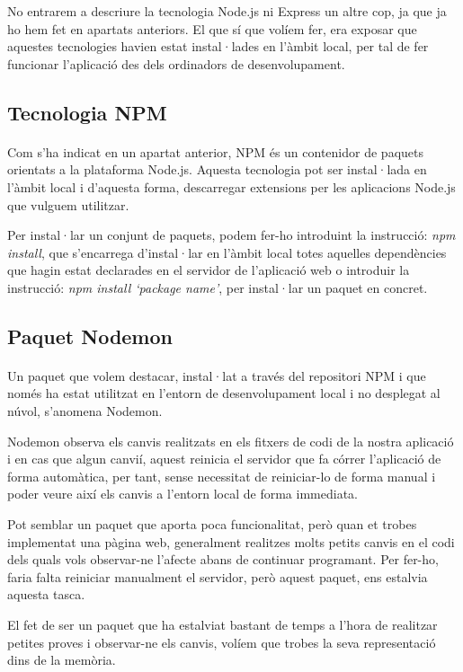     No entrarem a descriure la tecnologia Node.js ni Express un altre cop, ja que ja ho hem fet en apartats anteriors. El que sí que volíem fer, era exposar que aquestes tecnologies havien estat instal·lades en l’àmbit local, per tal de fer funcionar l'aplicació des dels ordinadors de desenvolupament.


    \subsection{Tecnologia NPM}

    \paragraph{}
    Com s'ha indicat en un apartat anterior, NPM és un contenidor de paquets orien\-tats a la plataforma Node.js. Aquesta tecnologia pot ser instal·lada en l'àmbit lo\-cal i d'aquesta forma, descarregar extensions per les aplicacions Node.js que vulguem utilitzar.

    Per instal·lar un conjunt de paquets, podem fer-ho introduint la instrucció: \emph{npm install}, que s’encarrega d’instal·lar en l’àmbit local totes aquelles dependències que hagin estat declarades en el servidor de l’aplicació web o introduir la instrucció: \emph{npm install `package name’}, per instal·lar un paquet en concret.


    \subsection{Paquet Nodemon}

    \paragraph{}
    Un paquet que volem destacar, instal·lat a través del repositori NPM i que només ha estat utilitzat en l’entorn de desenvolupament local i no desplegat al núvol, s’anomena Nodemon.

    Nodemon observa els canvis realitzats en els fitxers de codi de la nostra aplicació i en cas que algun canvií, aquest reinicia el servidor que fa córrer l'aplicació de forma automàtica, per tant, sense necessitat de reiniciar-lo de forma manual i poder veure així els canvis a l'entorn local de forma immediata.

    Pot semblar un paquet que aporta poca funcionalitat, però quan et trobes implementat una pàgina web, generalment realitzes molts petits canvis en el codi dels quals vols observar-ne l'afecte abans de continuar programant. Per fer-ho, faria falta reiniciar manualment el servidor, però aquest paquet, ens estalvia aquesta tasca.

    El fet de ser un paquet que ha estalviat bastant de temps a l'hora de realitzar petites proves i observar-ne els canvis, volíem que trobes la seva representació dins de la memòria.
